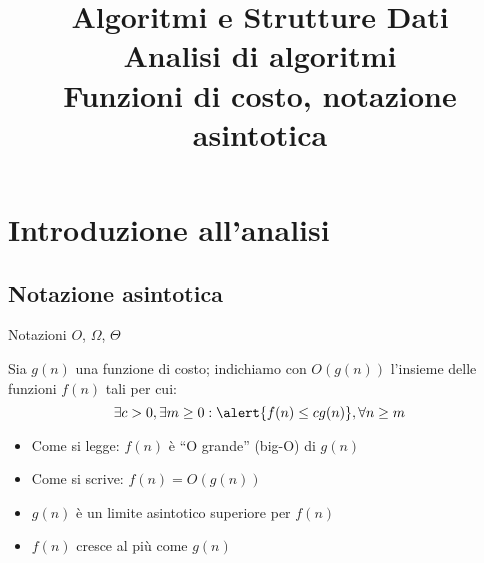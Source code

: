 \title[ASD - Analisi di algoritmi]{\textbf{Algoritmi e Strutture Dati}\\[18pt]Analisi di algoritmi\\Funzioni di costo, notazione asintotica}


\FrameTitle{}


\section{Introduzione all'analisi}

\subsection{Notazione asintotica}

\begin{frame}{Notazioni $O$, $\Omega$, $\Theta$}

\begin{myboxtitle}
Sia $g(n)$ una funzione di costo; indichiamo con $O(g(n))$ l'insieme
delle funzioni $f(n)$ tali per cui:\\[-6pt]
\[
  \exists c>0, \exists m \geq 0: \alert{f(n) \leq cg(n)}, \forall n \geq m
\]
\end{myboxtitle}

\medskip
\begin{itemize}
\item Come si legge: $f(n)$ è “\alert{O grande}” (big-O) di $g(n)$
\item Come si scrive: $f(n) = O(g(n))$
\item $g(n)$ è un \alert{limite asintotico superiore} per $f(n)$
\item $f(n)$ cresce al più come $g(n)$
\end{itemize}

\end{frame}

